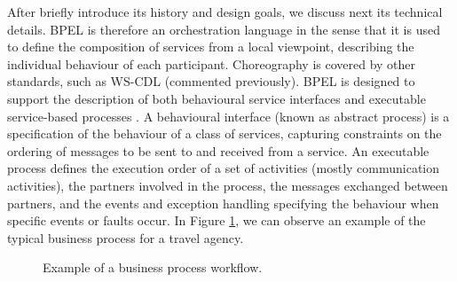 After briefly introduce its history and design goals, we discuss next its technical details. 
BPEL is therefore an orchestration
language in the sense that it is used to define the composition
of services from a local viewpoint, describing the individual
behaviour of each participant. Choreography is covered by other standards,
such as WS-CDL (commented previously). BPEL is designed to support the description of both behavioural service interfaces and executable
service-based processes \cite{OuyangVABDH07}. A behavioural interface (known as abstract process) is a specification of the
behaviour of a class of services, capturing constraints on the ordering of messages to be sent to and
received from a service. An executable process defines the execution
order of a set of activities (mostly communication activities), the partners involved in the process, the
messages exchanged between partners, and the events and exception handling specifying the behaviour
when specific events or faults occur. In Figure \ref{bpelexample}, we can observe an example of the typical business process
for a travel agency.

\begin{figure}[h]
\begin{center}
\end{center}
\caption{Example of a business process workflow.}
\label{bpelexample}
\end{figure}

